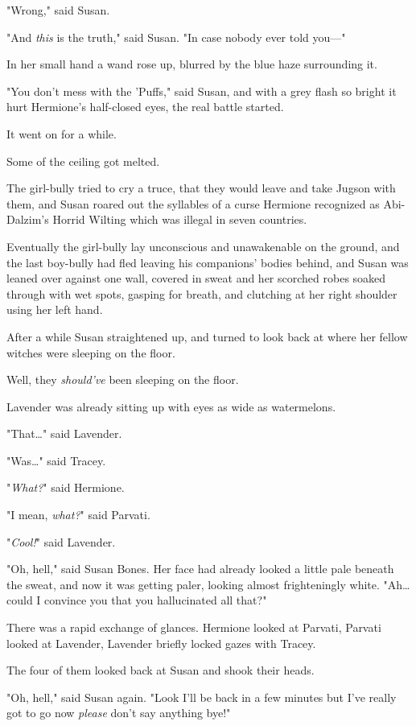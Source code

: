 "Wrong," said Susan.

"And \emph{this} is the truth," said Susan. "In case nobody ever told you---"

In her small hand a wand rose up, blurred by the blue haze surrounding it.

"You don't mess with the 'Puffs," said Susan, and with a grey flash so bright 
it hurt Hermione's half-closed eyes, the real battle started.

It went on for a while.

Some of the ceiling got melted.

The girl-bully tried to cry a truce, that they would leave and take Jugson with 
them, and Susan roared out the syllables of a curse Hermione recognized as 
Abi-Dalzim's Horrid Wilting which was illegal in seven countries.

Eventually the girl-bully lay unconscious and unawakenable on the ground, and 
the last boy-bully had fled leaving his companions' bodies behind, and Susan 
was leaned over against one wall, covered in sweat and her scorched robes 
soaked through with wet spots, gasping for breath, and clutching at her right 
shoulder using her left hand.

After a while Susan straightened up, and turned to look back at where her 
fellow witches were sleeping on the floor.

Well, they \emph{should've} been sleeping on the floor.

Lavender was already sitting up with eyes as wide as watermelons.

"That{\ldots}" said Lavender.

"Was{\ldots}" said Tracey.

"\emph{What?}" said Hermione.

"I mean,\emph{ what?}" said Parvati.

"\emph{Cool!}" said Lavender.

"Oh, hell," said Susan Bones. Her face had already looked a little pale beneath 
the sweat, and now it was getting paler, looking almost frighteningly white. 
"Ah{\ldots} could I convince you that you hallucinated all that?"

There was a rapid exchange of glances. Hermione looked at Parvati, Parvati 
looked at Lavender, Lavender briefly locked gazes with Tracey.

The four of them looked back at Susan and shook their heads.

"Oh, hell," said Susan again. "Look I'll be back in a few minutes but I've 
really got to go now \emph{please} don't say anything bye!"

